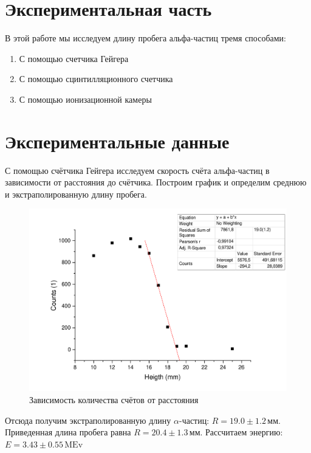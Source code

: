 \documentclass[a4paper,12pt]{article}
\begin{document}
	\section{Экспериментальная часть}
	    В этой работе мы исследуем длину пробега альфа-частиц тремя способами:
	    \begin{enumerate}
	        \item С помощью счетчика Гейгера
	        \item С помощью сцинтилляционного счетчика
	        \item С помощью ионизационной камеры
	    \end{enumerate}
	    
	\section{Экспериментальные данные}
		С помощью счётчика Гейгера исследуем скорость счёта альфа-частиц в зависимости от расстояния до счётчика. Построим график и определим среднюю и экстраполированную длину пробега.
		\begin{figure}[h!]
        \centering
        \includegraphics[width=\textwidth]{geig}
        \caption{Зависимость количества счётов от расстояния}
    \end{figure}
    
    Отсюда получим экстраполированную длину $\alpha$-частиц: $R = 19.0\pm 1.2\,\textit{мм}$. Приведенная длина пробега равна $R = 20.4\pm 1.3\,\textit{мм}$.
    Рассчитаем энергию: $E = 3.43 \pm 0.55 \,\mathrm{MEv}$
    
\end{document}

